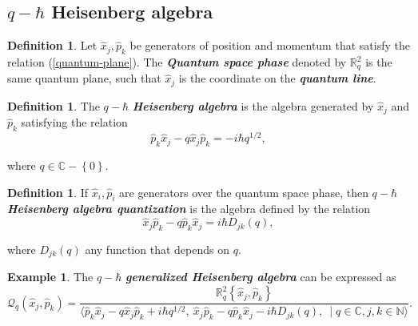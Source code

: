 \documentclass[12pt,a4paper]{article}
\theoremstyle{plain}
\theoremstyle{definition}
\newtheorem{definition}[theorem]{Definition}
\newtheorem{example}[theorem]{Example}
\theoremstyle{remark}
\begin{document}
\subsection{\texorpdfstring{$q-\hbar$}{Lg} Heisenberg algebra}
\begin{definition}\cite{Arefeva-Volovich1991}
    Let $\hat{x}_{j}, \hat{p}_{k}$ be generators of position and momentum that satisfy the relation (\ref{quantum-plane}). The \textit{\textbf{Quantum space phase}} denoted by $\mathbb{R}^{2}_{q}$ is the same quantum plane, such that $\hat{x}_{j}$ is the coordinate on the \textit{\textbf{quantum line}}.
\end{definition}

\begin{definition}\cite{Arefeva-Volovich1991}\label{Arefeva-Volovich1991definition2}
    The $q-\hbar$ \textit{\textbf{Heisenberg algebra}} is the algebra generated by $\hat{x}_{j}$ and $\hat{p}_{k}$ satisfying the relation
    \begin{equation}\label{h-bar-Heis}
        \hat{p}_{k}\hat{x}_{j}-q\hat{x}_{j}\hat{p}_{k}=-i\hbar q^{1/2},
    \end{equation}
    
where $q\in\mathbb{C}-\left\lbrace 0\right\rbrace$.
\end{definition}

\begin{definition}\cite{Arefeva-Volovich1991} \label{Arefeva-Volovich1991definition}
     If $\hat{x}_{i},\hat{p}_{i}$ are generators over the quantum space phase, then $q-\hbar$ \textit{\textbf{Heisenberg algebra quantization}} is the algebra defined by the relation 
\begin{equation}\label{quantization}
     \hat{x}_{j}\hat{p}_{k}-q\hat{p}_{k}\hat{x}_{j}=i\hbar D_{jk}(q),
\end{equation}
     
where $D_{jk}(q)$ any function that depends on $q$.
\end{definition}

\begin{example}\cite{Arefeva-Volovich1991}
    The $q-\hbar$ \textit{\textbf{generalized Heisenberg algebra}} can be expressed as
    \begin{equation*}
        \mathcal{Q}_{q}(\hat{x}_{j}, \hat{p}_{k})=\frac{\mathbb{R}^{2}_{q}\left\{ \hat{x}_{j}, \hat{p}_{k} \right\}}{\langle \hat{p}_{k}\hat{x}_{j} - q\hat{x}_{j}\hat{p}_{k}+i\hbar q^{1/2}, \ \hat{x}_{j}\hat{p}_{k} - q\hat{p}_{k}\hat{x}_{j}-i\hbar D_{jk}(q), \ \mid q\in\mathbb{C}, j,k\in\mathbb{N}\rangle}.
    \end{equation*}
\end{example}
\end{document}
